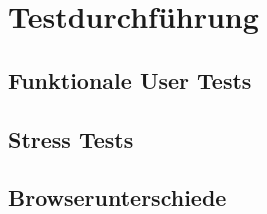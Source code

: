 \section{Testdurchführung}

\subsection{Funktionale User Tests}

\subsection{Stress Tests}

\subsection{Browserunterschiede}